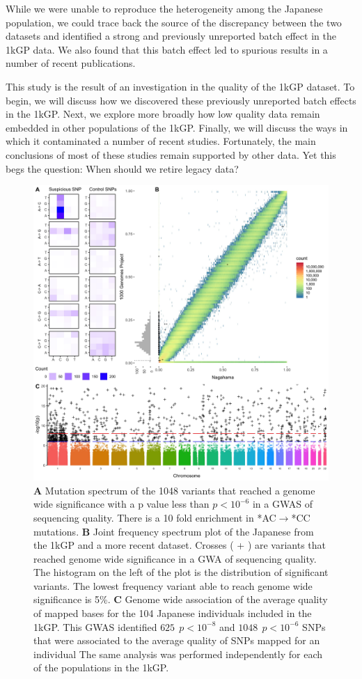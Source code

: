 \documentclass[9pt,lineno]{elife}
\begin{document}
While we were unable to reproduce the heterogeneity among the Japanese population, we could trace back the source of the discrepancy between the two datasets and identified a strong and previously unreported batch effect in the 1kGP data.
We also found that this batch effect led to spurious results in a number of recent publications. 

This study is the result of an investigation in the quality of the 1kGP dataset. 
To begin, we will discuss how we discovered these previously unreported batch effects in the 1kGP. 
Next, we explore more broadly how low quality data remain embedded in other populations of the 1kGP. 
Finally, we will discuss the ways in which it contaminated a number of recent studies.
Fortunately, the main conclusions of most of these studies remain supported by other data.
Yet this begs the question: When should we retire legacy data?

\begin{figure}
\includegraphics[width=\hsize,keepaspectratio]{Figure1.jpg}
\caption{
\textbf{A} 
Mutation spectrum of the 1048 variants that reached a genome wide significance with a p value less than $p < 10^{-6}$  in a GWAS of sequencing quality. 
There is a 10 fold enrichment in *AC${\rightarrow}$*CC mutations. 
\textbf{B} 
Joint frequency spectrum plot of the Japanese from the 1kGP and a more recent dataset.
Crosses ( + ) are variants that reached genome wide significance in a GWA of sequencing quality. 
The histogram on the left of the plot is the distribution of significant variants. 
The lowest frequency variant able to reach genome wide significance is 5\%.
\textbf{C} 
Genome wide association of the average quality of mapped bases for the 104 Japanese individuals included in the 1kGP. This GWAS identified $625\ \  p < 10^{-8}$ and $1048\ \ p < 10^{-6}$ SNPs that were associated to the average quality of SNPs mapped for an individual
The same analysis was performed independently for each of the populations in the 1kGP. }
 \label{SFS}
\end{figure}
\end{document}
